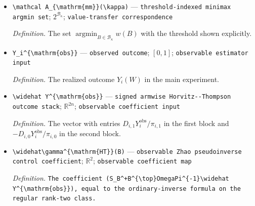 \documentclass{article}
\begin{document}
\begin{itemize}
  \par\smallskip\noindent\emph{Definition.} \texttt{The bijection from the ordinary rank-\allowbreak{}two projective class (\textbackslash{}\allowbreak{}mathcal B\_\allowbreak{}Z) onto the rank-\allowbreak{}two stratum of the note's quotient (\textbackslash{}\allowbreak{}mathcal B\_\allowbreak{}Z\textasciicircum{}+\allowbreak{}).}
  \item \texttt{\textbackslash{}\allowbreak{}mathcal A\_\allowbreak{}\{\textbackslash{}\allowbreak{}mathrm\{mm\}\allowbreak{}\}\allowbreak{}(\textbackslash{}\allowbreak{}kappa)} --- \texttt{threshold-\allowbreak{}indexed minimax argmin set}; \(2^{\mathcal B_\kappa}\); \texttt{value-\allowbreak{}transfer correspondence}
  \par\smallskip\noindent\emph{Definition.} The set \(\operatorname*{argmin}_{B\in\mathcal B_\kappa}w(B)\) with the threshold shown explicitly.
  \item \texttt{Y\_\allowbreak{}i\textasciicircum{}\{\textbackslash{}\allowbreak{}mathrm\{obs\}\allowbreak{}\}\allowbreak{}} --- \texttt{observed outcome}; \([0,1]\); \texttt{observable estimator input}
  \par\smallskip\noindent\emph{Definition.} The realized outcome \(Y_i(W)\) in the main experiment.
  \item \texttt{\textbackslash{}\allowbreak{}widehat Y\textasciicircum{}\{\textbackslash{}\allowbreak{}mathrm\{obs\}\allowbreak{}\}\allowbreak{}} --- \texttt{signed armwise Horvitz-\allowbreak{}-\allowbreak{}Thompson outcome stack}; \(\mathbb R^{2n}\); \texttt{observable coefficient input}
  \par\smallskip\noindent\emph{Definition.} The vector with entries \(D_{i,1}Y_i^{\mathrm{obs}}/\pi_{i,1}\) in the first block and \(-D_{i,0}Y_i^{\mathrm{obs}}/\pi_{i,0}\) in the second block.
  \item \texttt{\textbackslash{}\allowbreak{}widehat\textbackslash{}\allowbreak{}gamma\textasciicircum{}\{\textbackslash{}\allowbreak{}mathrm\{HT\}\allowbreak{}\}\allowbreak{}(B)} --- \texttt{observable Zhao pseudoinverse control coefficient}; \(\mathbb R^2\); \texttt{observable coefficient map}
  \par\smallskip\noindent\emph{Definition.} \texttt{The coefficient (S\_\allowbreak{}B\textasciicircum{}+\allowbreak{}B\textasciicircum{}\{\textbackslash{}\allowbreak{}top\}\allowbreak{}OmegaPi\textasciicircum{}\{-\allowbreak{}1\}\allowbreak{}\textbackslash{}\allowbreak{}widehat Y\textasciicircum{}\{\textbackslash{}\allowbreak{}mathrm\{obs\}\allowbreak{}\}\allowbreak{}),\allowbreak{} equal to the ordinary-\allowbreak{}inverse formula on the regular rank-\allowbreak{}two class.}

\end{itemize}
\end{document}
